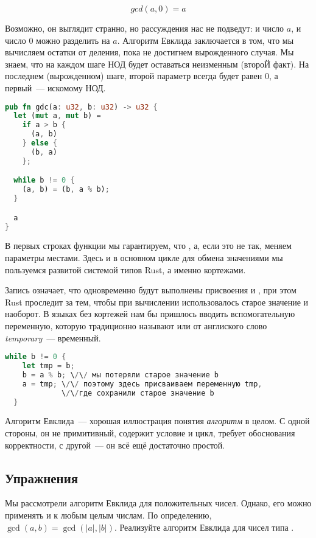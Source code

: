 $$
gcd(a, 0) = a
$$

Возможно, он выглядит странно, но рассуждения нас не подведут: и число $a$, и число $0$ можно разделить на $a$.
Алгоритм Евклида заключается в том, что мы вычисляем остатки от деления, пока не достигнем вырожденного случая.
Мы знаем, что на каждом шаге НОД будет оставаться неизменным (второЙ факт).
На последнем (вырожденном) шаге, второй параметр всегда будет равен $0$, а первый~--- искомому НОД.

\begin{lstlisting}[language=Rust]
pub fn gdc(a: u32, b: u32) -> u32 {
  let (mut a, mut b) =
    if a > b {
      (a, b)
    } else {
      (b, a)
    };

  while b != 0 {
    (a, b) = (b, a % b);
  }

  a
}
\end{lstlisting}

В первых строках функции мы гарантируем, что , а, если это не так, меняем параметры местами.
Здесь и в основном цикле для обмена значениями мы пользуемся развитой системой типов Rust, а именно кортежами.

Запись  означает, что одновременно будут выполнены присвоения  и , при этом Rust проследит за тем, чтобы при вычислении  использовалось старое значение  и наоборот.
В языках без кортежей нам бы пришлось вводить вспомогательную переменную, которую традиционно называют  или  от англиского слово {\em temporary} — временный.

\begin{lstlisting}[language=Rust]
  while b != 0 {
    let tmp = b;
    b = a % b; \/\/ мы потеряли старое значение b
    a = tmp; \/\/ поэтому здесь присваиваем переменную tmp, 
             \/\/где сохранили старое значение b
  }
\end{lstlisting}

Алгоритм Евклида~--- хорошая иллюстрация понятия {\em алгоритм} в целом.
С одной стороны, он не примитивный, содержит условие и цикл, требует обоснования корректности, с другой~--- он всё ещё достаточно простой.

\subsection{Упражнения}

\begin{Exercise}
  \Question
  Мы рассмотрели алгоритм Евклида для положительных чисел.
  Однако, его можно применять и к любым целым числам.
  По определению, $\gcd(a, b) = \gcd(|a|, |b|)$.
  Реализуйте алгоритм Евклида для чисел типа .
\end{Exercise}

